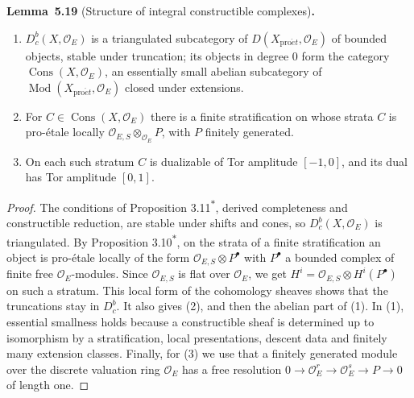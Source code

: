 \documentclass[11pt]{article}
\newenvironment{bpstatement}[2]{\par\addvspace{0.6\baselineskip}\noindent\textbf{#1}#2\textbf{.}\enspace\ignorespaces}
  {\par\addvspace{0.4\baselineskip}}
\newenvironment{bpstatementit}[2]{\begin{bpstatement}{#1}{#2}\itshape\ignorespaces}{\end{bpstatement}}
\newcommand{\bpout}[1]{#1\textsuperscript{\hyperlink{bp-outside}{\ensuremath{\ast}}}}
\providecommand{\Cons}{}\renewcommand{\Cons}{\operatorname{Cons}}
\providecommand{\Dbc}{}\renewcommand{\Dbc}{D^b_c}
\begin{document}
\label{bp65}%
\begin{bpstatementit}{Lemma~5.19}{ (Structure of integral constructible complexes)}
\begin{enumerate}
\item \(\Dbc(X,\mathcal O_E)\) is a triangulated subcategory of \(D(X_{\mathrm{pro}\acute{e}t},\mathcal O_E)\) of bounded objects, stable under truncation; its objects in degree \(0\) form the category \(\Cons(X,\mathcal O_E)\), an essentially small abelian subcategory of \(\operatorname{Mod}(X_{\mathrm{pro}\acute{e}t},\mathcal O_E)\) closed under extensions.
\item For \(C\in\Cons(X,\mathcal O_E)\) there is a finite stratification on whose strata \(C\) is pro-étale locally \(\mathcal O_{E,S}\otimes_{\mathcal O_E}P\), with \(P\) finitely generated.
\item On each such stratum \(C\) is dualizable of Tor amplitude \([-1,0]\), and its dual has Tor amplitude \([0,1]\).
\end{enumerate}
\end{bpstatementit}

\begin{proof}[{Proof}]\label{bp66}%
The conditions of Proposition \bpout{3.11}, derived completeness and constructible reduction, are stable under shifts and cones, so \(\Dbc(X,\mathcal O_E)\) is triangulated. By Proposition \bpout{3.10}, on the strata of a finite stratification an object is pro-étale locally of the form \(\mathcal O_{E,S}\otimes P^\bullet\) with \(P^\bullet\) a bounded complex of finite free \(\mathcal O_E\)-modules. Since \(\mathcal O_{E,S}\) is flat over \(\mathcal O_E\), we get \(H^i=\mathcal O_{E,S}\otimes H^i(P^\bullet)\) on such a stratum. This local form of the cohomology sheaves shows that the truncations stay in \(\Dbc\). It also gives (2), and then the abelian part of (1). In (1), essential smallness holds because a constructible sheaf is determined up to isomorphism by a stratification, local presentations, descent data and finitely many extension classes. Finally, for (3) we use that a finitely generated module over the discrete valuation ring \(\mathcal O_E\) has a free resolution \(0\to\mathcal O_E^r\to\mathcal O_E^s\to P\to0\) of length one.
\end{proof}
\end{document}
